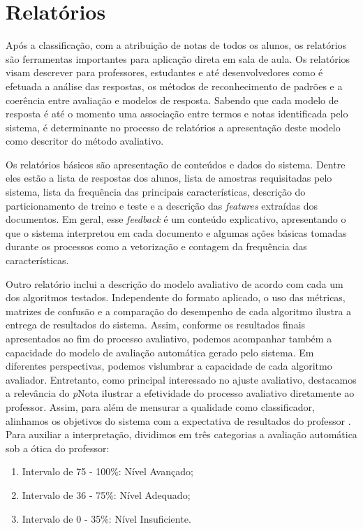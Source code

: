\begin{minipage}[!h]{0.45\textwidth}
\section{Relatórios}

Após a classificação, com a atribuição de notas de todos os alunos, os relatórios são ferramentas importantes para aplicação direta em sala de aula. Os relatórios visam descrever para professores, estudantes e até desenvolvedores como é efetuada a análise das respostas, os métodos de reconhecimento de padrões e a coerência entre avaliação e modelos de resposta. Sabendo que cada modelo de resposta é até o momento uma associação entre termos e notas identificada pelo sistema, é determinante no processo de relatórios a apresentação deste modelo como descritor do método avaliativo.

Os relatórios básicos são apresentação de conteúdos e dados do sistema. Dentre eles estão a lista de respostas dos alunos, lista de amostras requisitadas pelo sistema, lista da frequência das principais características, descrição do particionamento de treino e teste e a descrição das \textit{features} extraídas dos documentos. Em geral, esse \textit{feedback} é um conteúdo explicativo, apresentando o que o sistema interpretou em cada documento e algumas ações básicas tomadas durante os processos como a vetorização e contagem da frequência das características.

Outro relatório inclui a descrição do modelo avaliativo de acordo com cada um dos algoritmos testados. Independente do formato aplicado, o uso das métricas, matrizes de confusão e a comparação do desempenho de cada algoritmo ilustra a entrega de resultados do sistema. Assim, conforme os resultados finais apresentados ao fim do processo avaliativo, podemos acompanhar também a capacidade do modelo de avaliação automática gerado pelo sistema. Em diferentes perspectivas, podemos vislumbrar a capacidade de cada algoritmo avaliador. Entretanto, como principal interessado no ajuste avaliativo, destacamos a relevância do \textit{p}Nota ilustrar a efetividade do processo avaliativo diretamente ao professor. Assim, para além de mensurar a qualidade como classificador, alinhamos os objetivos do sistema com a expectativa de resultados do professor \cite{nascimento2020}. Para auxiliar a interpretação, dividimos em três categorias a avaliação automática sob a ótica do professor:

\begin{enumerate}
	\item Intervalo de 75 - 100\%: Nível Avançado;
	\item Intervalo de 36 - 75\%: Nível Adequado;
	\item Intervalo de 0 - 35\%: Nível Insuficiente.
\end{enumerate}


\end{minipage}
